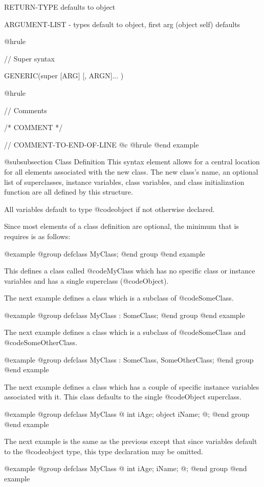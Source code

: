 RETURN-TYPE defaults to object

ARGUMENT-LIST - types default to object,
                first arg (object self) defaults

@hrule

//  Super syntax

GENERIC(super [ARG]  [, ARGN]... )

@hrule

//  Comments

/*  COMMENT  */

//  COMMENT-TO-END-OF-LINE
@c @hrule
@end example

@subsubsection Class Definition
This syntax element allows for a central location for all elements
associated with the new class.  The new class's name, an optional
list of superclasses, instance variables, class variables, and
class initialization function are all defined by this structure.

All variables default to type @code{object} if not otherwise
declared.

Since most elements of a class definition are optional, the minimum
that is requires is as follows:

@example
@group
defclass   MyClass;
@end group
@end example


This defines a class called @code{MyClass} which has no specific class
or instance variables and has a single superclass (@code{Object}).

The next example defines a class which is a subclass of @code{SomeClass}.

@example
@group
defclass   MyClass : SomeClass;
@end group
@end example


The next example defines a class which is a subclass of @code{SomeClass}
and @code{SomeOtherClass}.

@example
@group
defclass   MyClass : SomeClass, SomeOtherClass;
@end group
@end example


The next example defines a class which has a couple of specific
instance variables associated with it.  This class defaults to
the single @code{Object} superclass.

@example
@group
defclass   MyClass  @{
        int     iAge;
        object  iName;
@};
@end group
@end example

The next example is the same as the previous except that since
variables default to the @code{object} type, this type declaration
may be omitted.

@example
@group
defclass   MyClass  @{
        int     iAge;
        iName;
@};
@end group
@end example


